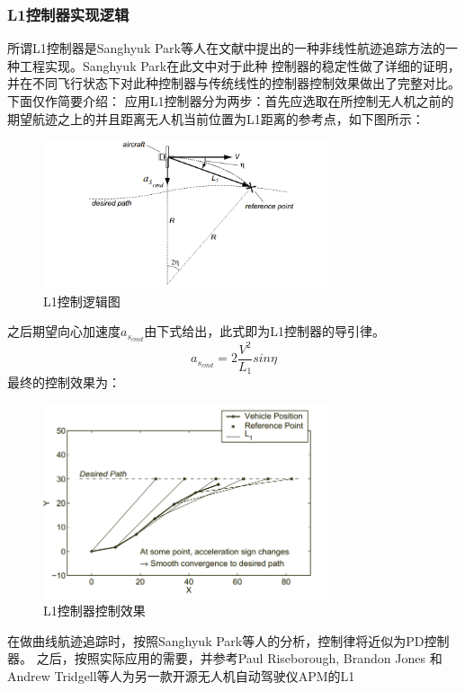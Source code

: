 \subsubsection{L1控制器实现逻辑}
所谓L1控制器是Sanghyuk Park等人在文献\cite{Park_2004}中提出的一种非线性航迹追踪方法的一种工程实现。Sanghyuk Park在此文中对于此种
控制器的稳定性做了详细的证明，并在不同飞行状态下对此种控制器与传统线性的控制器控制效果做出了完整对比。下面仅作简要介绍：
应用L1控制器分为两步：首先应选取在所控制无人机之前的期望航迹之上的并且距离无人机当前位置为L1距离的参考点，如下图\cite{Park_2004}所示：
\begin{figure}[H]
    \centering
    \includegraphics[width=0.75\textwidth]{figures/c3/L1_control}
    \caption{L1控制逻辑图}\label{fig:L1_control}
\end{figure}
之后期望向心加速度$a_{s_{cmd}}$由下式\cite{Park_2004}给出，此式即为L1控制器的导引律。
\begin{equation}
    a_{s_{cmd}}=2\frac{V^2}{L_1}sin\eta
\end{equation}
最终的控制效果为：
\begin{figure}[H]
    \centering
    \includegraphics[width=0.75\textwidth]{figures/c3/L1_eff}
    \caption{L1控制器控制效果}\label{fig：c3-L1_eff}
\end{figure}
在做曲线航迹追踪时，按照Sanghyuk Park等人的分析，控制律将近似为PD控制器。
之后，按照实际应用的需要，并参考Paul Riseborough, Brandon Jones 和 Andrew Tridgell等人为另一款开源无人机自动驾驶仪APM的L1
